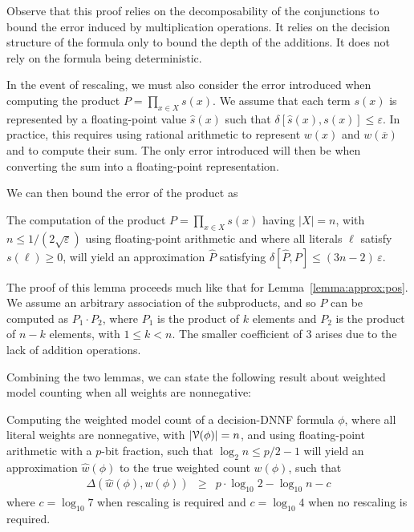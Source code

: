 \documentclass[letterpaper,USenglish,cleveref, autoref, thm-restate]{lipics-v2021}
\newcommand{\obar}[1]{\overline{#1}}
\newcommand{\lit}{\ell}
\newcommand{\approximate}[1]{\hat{#1}}
\newcommand{\approxP}{\approximate{P}}
\newcommand{\approxw}{\approximate{w}}
\newcommand{\approxs}{\approximate{s}}
\newcommand{\aerror}{\delta}
\newcommand{\digitprecision}{\Delta}
\newcommand{\roundepsilon}{\varepsilon}
\newcommand{\varset}{X}
\newcommand{\dependencyset}{{\cal V}}
\begin{document}
Observe that this proof relies on the decomposability of the
conjunctions to bound the error induced by multiplication operations.
It relies on the decision structure of the formula only to bound the
depth of the additions.  It does not rely on the formula being deterministic.

In the event of rescaling, we must also consider the error introduced
when computing the product $P = \prod_{x\in\varset} s(x)$.  We assume that
each term $s(x)$ is represented by a floating-point value
$\approxs(x)$ such that $\aerror[\approxs(x), s(x)] \leq
\roundepsilon$.  In practice, this requires using rational arithmetic
to represent $w(x)$ and $w(\obar{x})$ and to compute their sum.  The
only error introduced will then be when converting the sum into
a floating-point representation.

We can then bound the error of the product as
\begin{lemma}
  The computation of the product $P = \prod_{x\in\varset} s(x)$ having
$|\varset| = n$, with $n \leq 1/(2\sqrt{\roundepsilon})$ using floating-point arithmetic
and where all literals $\ell$ satisfy $s(\lit) \geq 0$,
will yield an approximation $\approxP$ satisfying
  $\aerror[\approxP, P] \leq (3n-2)\,\roundepsilon$.
  \label{lemma:approx:product}
\end{lemma}

The proof of this lemma proceeds much like that for Lemma~\ref{lemma:approx:pos}.  We assume an arbitrary association of the subproducts, and so $P$ can be computed as
$P_1 \cdot P_2$, where $P_1$ is the product of $k$ elements and $P_2$ is the product of $n-k$ elements, with $1 \leq k < n$.
The smaller coefficient of $3$ arises due to the lack of addition operations.

Combining the two lemmas, we can state the following result about weighted model counting when all weights are nonnegative:
\begin{theorem}
  \label{thm:approx:pos}
Computing the weighted model count of
a decision-DNNF formula $\phi$, where all literal weights are nonnegative, with $|\dependencyset(\phi)| = n$, and using floating-point arithmetic with a $p$-bit fraction, such that $\log_2 n \leq p/2-1$
will yield an approximation $\approxw(\phi)$ to the true weighted count $w(\phi)$, such that
\begin{eqnarray}
\digitprecision(\approxw(\phi), w(\phi)) & \geq & p \cdot \log_{10}2 - \log_{10}n - c\label{eqn:precision:wmc}
\end{eqnarray}
where $c = \log_{10} 7$ when rescaling is required and $c = \log_{10} 4$ when no rescaling is required.
\end{theorem}
\end{document}
